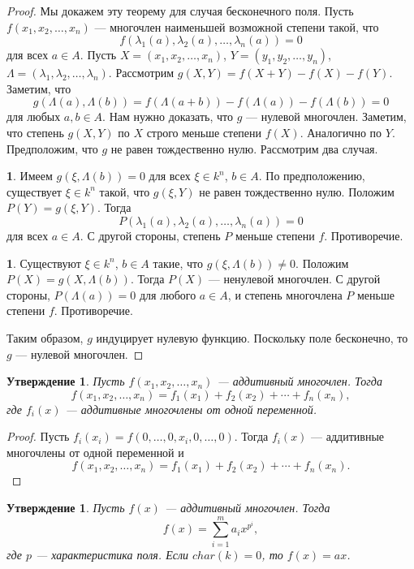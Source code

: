\documentclass[12pt, titlepage, oneside]{amsbook}
\newtheorem{claim}[theorem]{Утверждение}
\theoremstyle{definition}
\newtheorem{case}[theorem]{}
\theoremstyle{remark}
\begin{document}
\begin{proof}
Мы докажем эту теорему для случая бесконечного поля. Пусть $f(x_1,x_2,\ldots,x_n)$ --- многочлен наименьшей возможной степени такой, что $$f(\lambda_1(a),\lambda_2(a),\ldots,\lambda_n(a))=0$$ для всех $a\in A$. Пусть $X=(x_1,x_2,\ldots,x_n)$, $Y=(y_1,y_2,\ldots,y_n)$, $\Lambda=(\lambda_1,\lambda_2,\ldots,\lambda_n)$. Рассмотрим $g(X,Y)=f(X+Y)-f(X)-f(Y).$ Заметим, что $$g(\Lambda(a),\Lambda(b))=f(\Lambda(a+b))-f(\Lambda(a))-f(\Lambda(b))=0$$ для любых $a,b\in A$. Нам нужно доказать, что $g$ --- нулевой многочлен. Заметим, что степень $g(X,Y)$ по $X$ строго меньше степени $f(X)$. Аналогично по $Y$. Предположим, что $g$ не равен тождественно нулю. Рассмотрим два случая.
\begin{case}
Имеем $g(\xi,\Lambda(b))=0$ для всех $\xi\in k^n$, $b\in A$. По предположению, существует $\xi\in k^n$ такой, что $g(\xi,Y)$ не равен тождественно нулю. Положим $P(Y)=g(\xi,Y)$. Тогда $$P(\lambda_1(a),\lambda_2(a),\ldots,\lambda_n(a))=0$$ для всех $a\in A$. С другой стороны, степень $P$ меньше степени $f$. Противоречие.
\end{case}
\begin{case}
Существуют  $\xi\in k^n$, $b\in A$ такие, что $g(\xi,\Lambda(b))\neq 0$. Положим $P(X)=g(X,\Lambda(b))$. Тогда $P(X)$ --- ненулевой многочлен. С другой стороны, $P(\Lambda(a))=0$ для любого $a\in A$, и степень многочлена $P$ меньше степени $f$. Противоречие.
\end{case}
Таким образом, $g$ индуцирует нулевую функцию. Поскольку поле бесконечно, то $g$ --- нулевой многочлен.
\end{proof}

\begin{claim}
\label{NormBas2}
Пусть $f(x_1,x_2,\ldots,x_n)$ --- аддитивный многочлен. Тогда $$f(x_1,x_2,\ldots,x_n)=f_1(x_1)+f_2(x_2)+\cdots+f_n(x_n),$$ где $f_i(x)$ --- аддитивные многочлены от одной переменной.
\end{claim}

\begin{proof}
Пусть $f_i(x_i)=f(0,\ldots,0,x_i,0,\ldots,0)$. Тогда $f_i(x)$ --- аддитивные многочлены от одной переменной и $$f(x_1,x_2,\ldots,x_n)=f_1(x_1)+f_2(x_2)+\cdots+f_n(x_n).$$
\end{proof}

\begin{claim}
\label{NormBas3}
Пусть $f(x)$ --- аддитивный многочлен. Тогда $$f(x)=\sum\limits_{i=1}^m a_i x^{p^i},$$ где $p$ --- характеристика поля. Если $char(k)=0$, то $f(x)=ax$.
\end{claim}
\end{document}
